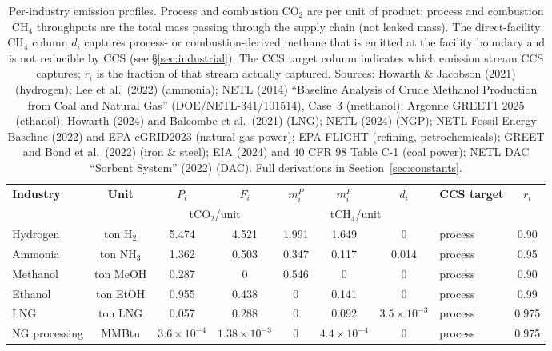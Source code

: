 \documentclass[11pt]{article}
\newcommand{\cotwo}{\ensuremath{\mathrm{CO_2}}}
\newcommand{\chfour}{\ensuremath{\mathrm{CH_4}}}
\begin{document}
\begin{table}[htbp]
\centering
\caption{Per-industry emission profiles.
Process and combustion \cotwo{} are per unit of product; process and combustion \chfour{} throughputs
are the total mass passing through the supply chain (not leaked mass).
The direct-facility \chfour{} column $d_i$ captures process- or combustion-derived methane that is emitted at the facility boundary and is not reducible by CCS (see \S\ref{sec:industrial}).
The CCS target column indicates which emission stream CCS captures;
$r_i$ is the fraction of that stream actually captured.
Sources: Howarth \& Jacobson (2021) (hydrogen); Lee et al.\ (2022) (ammonia); NETL (2014) ``Baseline Analysis of Crude Methanol Production from Coal and Natural Gas'' (DOE/NETL-341/101514), Case~3 (methanol); Argonne GREET1 2025 (ethanol); Howarth (2024) and Balcombe et al.\ (2021) (LNG); NETL (2024) (NGP); NETL Fossil Energy Baseline (2022) and EPA eGRID2023 (natural-gas power); EPA FLIGHT (refining, petrochemicals); GREET and Bond et al.\ (2022) (iron \& steel); EIA (2024) and 40 CFR 98 Table C-1 (coal power); NETL DAC ``Sorbent System'' (2022) (DAC). Full derivations in Section~\ref{sec:constants}.}
\label{tab:industry_params}
\footnotesize
\setlength{\tabcolsep}{4pt}
\begin{tabular}{@{}lcccccclc@{}}
\toprule
\textbf{Industry} & \textbf{Unit} & $P_i$ & $F_i$
  & $m_i^P$ & $m_i^F$ & $d_i$ & \textbf{CCS target} & $r_i$ \\
  & & \multicolumn{2}{c}{\scriptsize t\cotwo{}/unit}
  & \multicolumn{3}{c}{\scriptsize t\chfour{}/unit}
  & & \\
\midrule
Hydrogen                & ton H$_2$      & 5.474 & 4.521 & 1.991 & 1.649 & 0                    & process    & 0.90 \\
Ammonia                 & ton NH$_3$     & 1.362 & 0.503 & 0.347 & 0.117 & 0.014                & process    & 0.95 \\
Methanol                & ton MeOH       & 0.287 & 0     & 0.546 & 0     & 0                    & process    & 0.90 \\
Ethanol                 & ton EtOH       & 0.955 & 0.438 & 0     & 0.141 & 0                    & process    & 0.99 \\
LNG                     & ton LNG        & 0.057 & 0.288 & 0     & 0.092 & $3.5{\times}10^{-3}$ & process    & 0.975 \\
NG processing           & MMBtu          & $3.6{\times}10^{-4}$ & $1.38{\times}10^{-3}$
  & 0 & $4.4{\times}10^{-4}$ & 0                    & process & 0.975 \\

\end{tabular}
\end{table}
\end{document}
